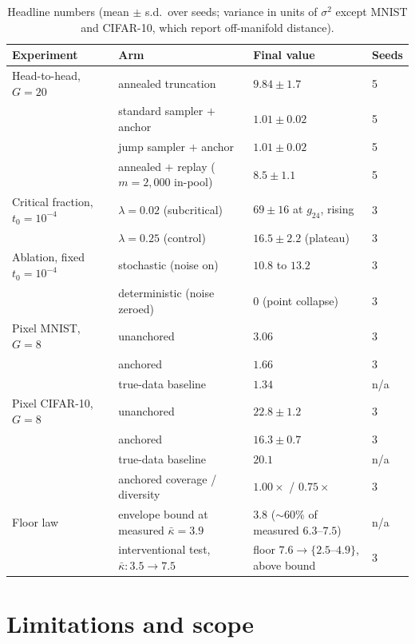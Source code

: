 \documentclass[11pt]{article}
\theoremstyle{remark}
\newcommand{\kb}{\bar\kappa}
\newcommand{\sigsq}{\sigma^2}
\begin{document}
\begin{table}[t]
\centering\small
\caption{Headline numbers (mean $\pm$ s.d.\ over seeds; variance in units of $\sigsq$
except MNIST and CIFAR-10, which report off-manifold distance).}
\label{tab:headline}
\begin{tabular}{llll}
\toprule
Experiment & Arm & Final value & Seeds \\
\midrule
Head-to-head, $G{=}20$ & annealed truncation \citep{khelifa2026recursive} & $9.84\pm1.7$ & 5 \\
 & standard sampler $+$ anchor & $1.01\pm0.02$ & 5 \\
 & jump sampler $+$ anchor & $1.01\pm0.02$ & 5 \\
 & annealed $+$ replay ($m{=}2{,}000$ in-pool) & $8.5\pm1.1$ & 5 \\
\midrule
Critical fraction, $t_0{=}10^{-4}$ & $\lambda=0.02$ (subcritical) & $69\pm16$ at $g_{24}$, rising & 3 \\
 & $\lambda=0.25$ (control) & $16.5\pm2.2$ (plateau) & 3 \\
\midrule
Ablation, fixed $t_0{=}10^{-4}$ & stochastic (noise on) & $10.8$ to $13.2$ & 3 \\
 & deterministic (noise zeroed) & $0$ (point collapse) & 3 \\
\midrule
Pixel MNIST, $G{=}8$ & unanchored & $3.06$ & 3 \\
 & anchored & $1.66$ & 3 \\
 & true-data baseline & $1.34$ & n/a \\
\midrule
Pixel CIFAR-10, $G{=}8$ & unanchored & $22.8\pm1.2$ & 3 \\
 & anchored & $16.3\pm0.7$ & 3 \\
 & true-data baseline & $20.1$ & n/a \\
 & anchored coverage / diversity & $1.00\times$ / $0.75\times$ & 3 \\
\midrule
Floor law & envelope bound at measured $\kb{=}3.9$ & $3.8$ (${\sim}60\%$ of measured $6.3$--$7.5$) & n/a \\
 & interventional test, $\kb\!:3.5\to7.5$ & floor $7.6\to\{2.5$--$4.9\}$, above bound & 3 \\
\bottomrule
\end{tabular}
\end{table}

\section{Limitations and scope}\label{sec:limits}
\end{document}
